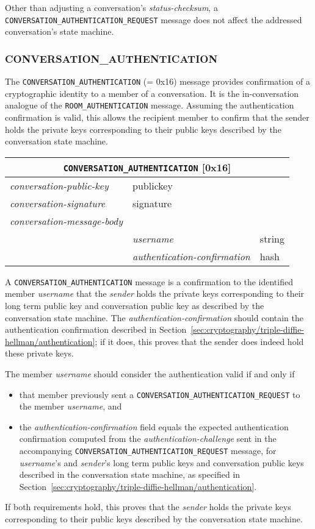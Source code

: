\documentclass{article}
\def\npmessage#1{\texttt{#1}}
\def\field#1{\textit{#1}}
\def\smfield#1{\textsl{#1}}
\def\type#1{\textsf{#1}}
\newenvironment{conversationmessage}[2]{
\newcommand{\messagefield}[2]{
& \field{##1} & \type{##2} \\
\hline
}
\hspace{2em minus 2em}\begin{tabular}{|l|l|l|}
\hline
\multicolumn{3}{|c|}{\npmessage{#1} [#2]} \\
\hline
\hline
\field{conversation-public-key} & \multicolumn{2}{l|}{\type{publickey}} \\
\hline
\field{conversation-signature} & \multicolumn{2}{l|}{\type{signature}} \\
\hline
\field{conversation-message-body} & \multicolumn{2}{l|}{} \\
\hline
}{
\end{tabular}
}
\begin{document}
Other than adjusting a conversation's \smfield{status-checksum}, a \npmessage{CONVERSATION\_AUTHENTICATION\_REQUEST} message does not affect the addressed conversation's state machine.


\subsubsection{CONVERSATION\_AUTHENTICATION}
\label{sec:messages/conversation-authentication}

The \npmessage{CONVERSATION\_AUTHENTICATION} (= 0x16) message provides confirmation of a cryptographic identity to a member of a conversation.
It is the in-conversation analogue of the \npmessage{ROOM\_AUTHENTICATION} message.
Assuming the authentication confirmation is valid, this allows the recipient member to confirm that the sender holds the private keys corresponding to their public keys described by the conversation state machine.

\begin{conversationmessage}{CONVERSATION\_AUTHENTICATION}{0x16}
\messagefield{username}{string}
\messagefield{authentication-confirmation}{hash}
\end{conversationmessage}

A \npmessage{CONVERSATION\_AUTHENTICATION} message is a confirmation to the identified member \field{username} that the \field{sender} holds the private keys corresponding to their long term public key and conversation public key as described by the conversation state machine.
The \emph{authentication-confirmation} should contain the authentication confirmation described in Section~\ref{sec:cryptography/triple-diffie-hellman/authentication}; if it does, this proves that the sender does indeed hold these private keys.

The member \field{username} should consider the authentication valid if and only if
\begin{itemize}
\item that member previously sent a \npmessage{CONVERSATION\_AUTHENTICATION\_REQUEST} to the member \emph{username}, and
\item the \field{authentication-confirmation} field equals the expected authentication confirmation computed from the \field{authentication-challenge} sent in the accompanying \npmessage{CONVERSATION\_AUTHENTICATION\_REQUEST} message, for \field{username}'s and \field{sender}'s long term public keys and conversation public keys described in the conversation state machine, as specified in Section~\ref{sec:cryptography/triple-diffie-hellman/authentication}.
\end{itemize}
If both requirements hold, this proves that the \field{sender} holds the private keys corresponding to their public keys described by the conversation state machine.
\end{document}
